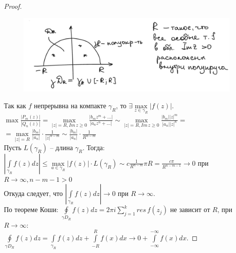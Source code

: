 \begin{proof}
    \ \\
    \begin{figure}[h]
        \centering
        \includegraphics[width=1\linewidth]{answers/img/ans21.png}
    \end{figure}

    Так как $f$ непрерывна на компакте $\gamma_R$, то $\exists \underset{z\in \gamma_R}{\max} |f(z)|$.\\[2mm]
    $\max\frac{|P_m(z)|}{|Q_n(z)|}=\underset{|z|=R, Im\,z\geq0}{\max} \frac{|b_mz^m+...|}{|a_nz^n+...|} \sim{} \underset{|z|=R, Im\,z\geq0}{\max} \frac{|b_m||z|^m}{|a_n||z|^n}= $\\[2mm]
    $=\underset{|z|=R}{\max}\frac{|b_m|}{|a_n|}\cdot\frac{1}{|z|^{n-m}}\sim{} \frac{|b_m|}{|a_n|}\cdot \frac{1}{R^{n-m}}$\\[2mm]
    Пусть $L(\gamma_R)$ -- длина $\gamma_R$. Тогда:\\[2mm]
    $\left|\int\limits_{\gamma_R}f(z)dz\right|\leq \underset{a\in\gamma_R}{\max}|f(z)|\cdot L(\gamma_R)\sim c\frac{1}{R^{n-m}}\pi R = \frac{c\pi}{R^{n-m-1}}\to 0$ при $R\to \infty, n-m-1>0$\\[2mm]
    Откуда следует, что $\left|\int\limits_{\gamma_R} f(z)dz\right| \to 0$ при $R\to \infty$.\\[2mm]
    По теореме Коши: $\oint\limits_{\gamma D_R}f(z)dz = 2\pi i \sum\limits_{j=1}^k res\, f(z_j)$ не зависит от $R$, при $R\to \infty:$\\[2mm]
    $\oint\limits_{\gamma D_R}f(z)dz = \int\limits_{\gamma_R}f(z)dz + \int\limits_{-R}^R f(x)dx \to 0+\int\limits_{-\infty}^{-\infty}f(x)dx$.
\end{proof}


